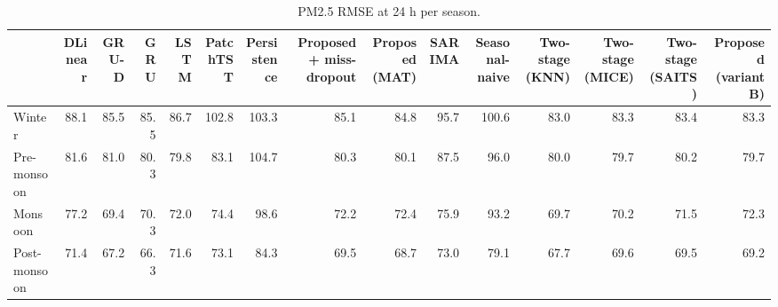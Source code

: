 \begin{table}
\caption{PM2.5 RMSE at 24 h per season.}
\label{tab:seasonal}
\begin{tabular}{lrrrrrrrrrrrrrr}
\toprule
 & DLinear & GRU-D & GRU & LSTM & PatchTST & Persistence & Proposed + miss-dropout & Proposed (MAT) & SARIMA & Seasonal-naive & Two-stage (KNN) & Two-stage (MICE) & Two-stage (SAITS) & Proposed (variant B) \\
\midrule
Winter & 88.1 & 85.5 & 85.5 & 86.7 & 102.8 & 103.3 & 85.1 & 84.8 & 95.7 & 100.6 & 83.0 & 83.3 & 83.4 & 83.3 \\
Pre-monsoon & 81.6 & 81.0 & 80.3 & 79.8 & 83.1 & 104.7 & 80.3 & 80.1 & 87.5 & 96.0 & 80.0 & 79.7 & 80.2 & 79.7 \\
Monsoon & 77.2 & 69.4 & 70.3 & 72.0 & 74.4 & 98.6 & 72.2 & 72.4 & 75.9 & 93.2 & 69.7 & 70.2 & 71.5 & 72.3 \\
Post-monsoon & 71.4 & 67.2 & 66.3 & 71.6 & 73.1 & 84.3 & 69.5 & 68.7 & 73.0 & 79.1 & 67.7 & 69.6 & 69.5 & 69.2 \\
\bottomrule
\end{tabular}
\end{table}
